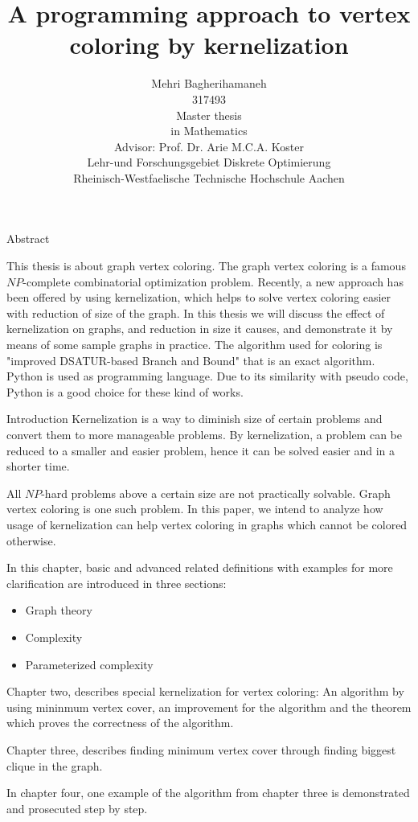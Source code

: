 \documentclass{beamer}
\title{A programming approach to vertex coloring by kernelization}
\author{{Mehri Bagherihamaneh}\\[.2cm]{317493}\\[1cm]{\small {Master thesis}}\\[.2cm]
{\small {in Mathematics}}\\[1cm]{\small {Advisor: Prof. Dr. Arie M.C.A. Koster}}\\[.5cm]{\small {Lehr-und Forschungsgebiet Diskrete Optimierung}}\\ {\small {Rheinisch-Westfaelische Technische Hochschule Aachen}}}
\begin{document}
\begin{frame}
  \titlepage
\end{frame}


\begin{frame}{Abstract}

This thesis is about graph vertex coloring. The graph vertex coloring is a famous $NP$-complete combinatorial optimization problem. Recently, a new approach has been offered by using kernelization, which helps to solve vertex coloring easier with reduction of size of the  graph. In this thesis we will discuss the effect of kernelization on graphs, and reduction in size it causes, and demonstrate it by means of some sample graphs in practice. The algorithm used for coloring is "improved DSATUR-based Branch and Bound" that is an exact algorithm. Python is used as programming language. Due to its similarity with pseudo code,  Python is a good choice for these kind of works.
\end{frame}

\begin{frame}{Introduction}
Kernelization is a way to diminish size of certain problems and convert them to more manageable problems. By kernelization, a problem can be reduced to a smaller and easier problem, hence it can be solved easier and in a shorter time. 

All $NP$-hard problems above a certain size are not practically solvable. Graph vertex coloring is one such problem. In this paper, we intend to analyze how usage of kernelization can help vertex coloring in graphs which cannot be colored otherwise.

In this chapter, basic and advanced related definitions with examples for more clarification are introduced in three sections:
\begin{itemize}
\item Graph theory
\item Complexity
\item Parameterized complexity
\end{itemize}
\end{frame}
Chapter two, describes special kernelization for vertex coloring: An algorithm by using mininmum vertex cover, an improvement for the algorithm and the theorem which proves the correctness of the algorithm.

Chapter three, describes finding minimum vertex cover through finding biggest clique in the graph.

In chapter four, one example of the algorithm from chapter three is demonstrated and prosecuted step by step.
\end{document}
